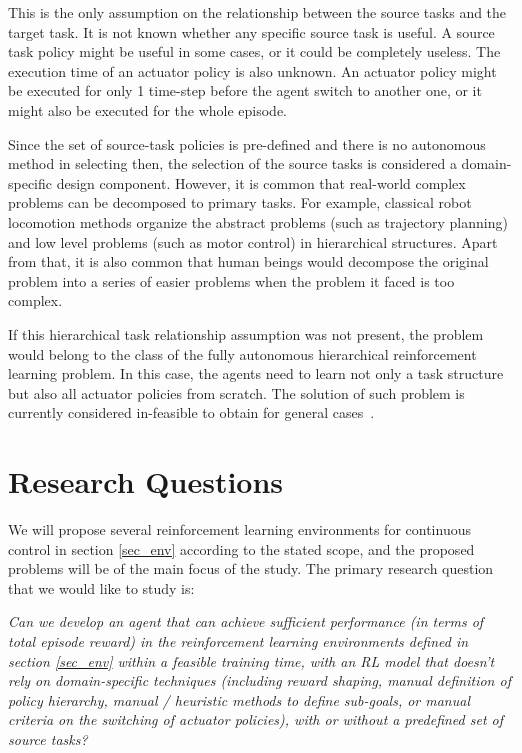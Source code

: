 This is the only assumption on the relationship between the source tasks and the target task. It is not known whether any specific source task is useful. A source task policy might be useful in some cases, or it could be completely useless. The execution time of an actuator policy is also unknown. An actuator policy might be executed for only 1 time-step before the agent switch to another one, or it might also be executed for the whole episode.

Since the set of source-task policies is pre-defined and there is no autonomous method in selecting then, the selection of the source tasks is considered a domain-specific design component. However, it is common that real-world complex problems can be decomposed to primary tasks. For example, classical robot locomotion methods organize the abstract problems (such as trajectory planning) and low level problems (such as motor control) in hierarchical structures. Apart from that, it is also common that human beings would decompose the original problem into a series of easier problems when the problem it faced is too complex.

If this hierarchical task relationship assumption was not present, the problem would belong to the class of the fully autonomous hierarchical reinforcement learning problem. In this case, the agents need to learn not only a task structure but also all actuator policies from scratch. The solution of such problem is currently considered in-feasible to obtain for general cases~\cite{barto2003recent}.


\section{Research Questions}


We will propose several reinforcement learning environments for continuous control in section \ref{sec_env} according to the stated scope, and the proposed problems will be of the main focus of the study.
The primary research question that we would like to study is:

    \textit{Can we develop an agent that can achieve sufficient performance (in terms of total episode reward) in the reinforcement learning environments defined in section \ref{sec_env} within a feasible training time, with an RL model that doesn't rely on domain-specific techniques  (including reward shaping, manual definition of policy hierarchy, manual / heuristic methods to define sub-goals, or manual criteria on the switching of actuator policies), with or without a predefined set of source tasks?}


